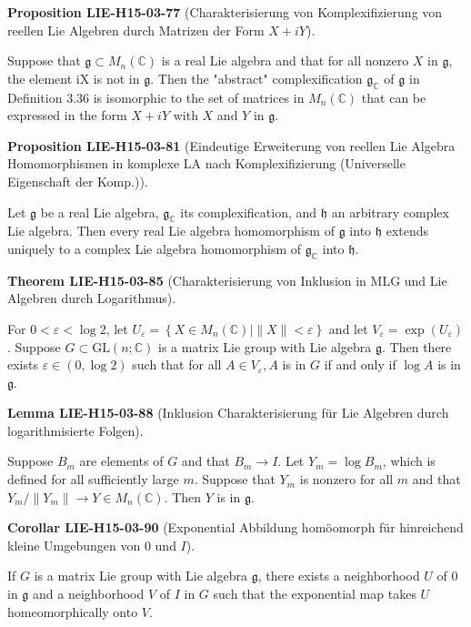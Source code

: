 \documentclass[10pt, letterpaper]{article}
\newcommand{\CustomHeading}[3]{%
  \par\medskip\noindent%
  \textbf{#1 #2} \textnormal{(#3)}.\enskip%
}
\newenvironment{PROP}[2]{\CustomHeading{Proposition}{#1}{#2}}{}
\newenvironment{THEO}[2]{\CustomHeading{Theorem}{#1}{#2}}{}
\newenvironment{LEM}[2]{\CustomHeading{Lemma}{#1}{#2}}{}
\newenvironment{KORO}[2]{\CustomHeading{Corollar}{#1}{#2}}{}
\begin{document}
\begin{PROP}{LIE-H15-03-77}{Charakterisierung von Komplexifizierung von reellen Lie Algebren durch Matrizen der Form $X+iY$}
Suppose that $\mathfrak{g} \subset M_{n}(\mathbb{C})$ is a real Lie algebra and that for all nonzero $X$ in $\mathfrak{g}$, the element iX is not in $\mathfrak{g}$. Then the "abstract" complexification $\mathfrak{g}_{\mathbb{C}}$ of $\mathfrak{g}$ in Definition 3.36 is isomorphic to the set of matrices in $M_{n}(\mathbb{C})$ that can be expressed in the form $X+i Y$ with $X$ and $Y$ in $\mathfrak{g}$.
\end{PROP}

\begin{PROP}{LIE-H15-03-81}{Eindeutige Erweiterung von reellen Lie Algebra Homomorphismen in komplexe LA nach Komplexifizierung (Universelle Eigenschaft der Komp.)}
Let $\mathfrak{g}$ be a real Lie algebra, $\mathfrak{g}_{\mathbb{C}}$ its complexification, and $\mathfrak{h}$ an arbitrary complex Lie algebra. Then every real Lie algebra homomorphism of $\mathfrak{g}$ into $\mathfrak{h}$ extends uniquely to a complex Lie algebra homomorphism of $\mathfrak{g}_{\mathbb{C}}$ into $\mathfrak{h}$.
\end{PROP}

\begin{THEO}{LIE-H15-03-85}{Charakterisierung von Inklusion in MLG und Lie Algebren durch Logarithmus}
For $0<\varepsilon<\log 2$, let $U_{\varepsilon}=\left\{X \in M_{n}(\mathbb{C}) \mid\|X\|<\varepsilon\right\}$ and let $V_{\varepsilon}=\exp \left(U_{\varepsilon}\right)$. Suppose $G \subset \mathrm{GL}(n ; \mathbb{C})$ is a matrix Lie group with Lie algebra $\mathfrak{g}$. Then there exists $\varepsilon \in(0, \log 2)$ such that for all $A \in V_{\varepsilon}, A$ is in $G$ if and only if $\log A$ is in $\mathfrak{g}$.
\end{THEO}

\begin{LEM}{LIE-H15-03-88}{Inklusion Charakterisierung für Lie Algebren durch logarithmisierte Folgen}
Suppose $B_{m}$ are elements of $G$ and that $B_{m} \rightarrow I$. Let $Y_{m}=\log B_{m}$, which is defined for all sufficiently large $m$. Suppose that $Y_{m}$ is nonzero for all $m$ and that $Y_{m} /\left\|Y_{m}\right\| \rightarrow Y \in M_{n}(\mathbb{C})$. Then $Y$ is in $\mathfrak{g}$.
\end{LEM}

\begin{KORO}{LIE-H15-03-90}{Exponential Abbildung homöomorph für hinreichend kleine Umgebungen von $0$ und $I$}
If $G$ is a matrix Lie group with Lie algebra $\mathfrak{g}$, there exists a neighborhood $U$ of 0 in $\mathfrak{g}$ and a neighborhood $V$ of $I$ in $G$ such that the exponential map takes $U$ homeomorphically onto $V$.
\end{KORO}
\end{document}
